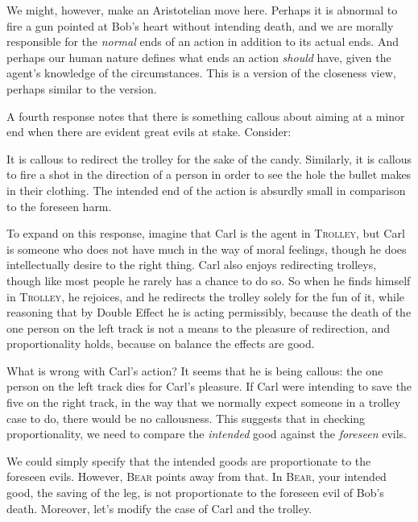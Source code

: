 We might, however, make an Aristotelian move here. Perhaps it is abnormal to fire a gun pointed at Bob's heart without intending
death, and we are morally responsible for the \textit{normal} ends of an action in addition to its actual ends. And perhaps
our human nature defines what ends an action \textit{should} have, given the agent's knowledge of the circumstances.
This is a version of the closeness view, perhaps similar to the  version. 

A fourth response notes that there is something callous about aiming at a minor end when there are evident great evils at stake. Consider:

It is callous to redirect the trolley for the sake of the candy. Similarly,
it is callous to fire a shot in the direction of a person in order to see the hole the bullet makes in their clothing. The intended 
end of the action is absurdly small in comparison to the foreseen harm. 

To expand on this response, imagine that Carl is the agent in \textsc{Trolley}, but Carl is someone who does not have much
in the way of moral feelings, though he does intellectually desire to the right thing. Carl also enjoys redirecting trolleys, 
though like most people he rarely has a chance to do so. So when he finds himself in \textsc{Trolley}, he rejoices, and he
redirects the trolley solely for the fun of it, while reasoning that by Double Effect he is acting permissibly, because the
death of the one person on the left track is not a means to the pleasure of redirection, and proportionality holds, because
on balance the effects are good. 

What is wrong with Carl's action? It seems that he is being callous: the one person on the left track dies for Carl's pleasure.
If Carl were intending to save the five on the right track, in the way that we normally expect someone in a trolley case to do, 
there would be no callousness. This suggests that in checking proportionality, we need to compare the \textit{intended} good 
against the \textit{foreseen} evils. 

We could simply specify that the intended goods are proportionate to the foreseen evils. However, \textsc{Bear} points away 
from that. In \textsc{Bear}, your intended good, the saving of the leg, is not proportionate to the foreseen evil of Bob's 
death. Moreover, let's modify the case of Carl and the trolley. 

